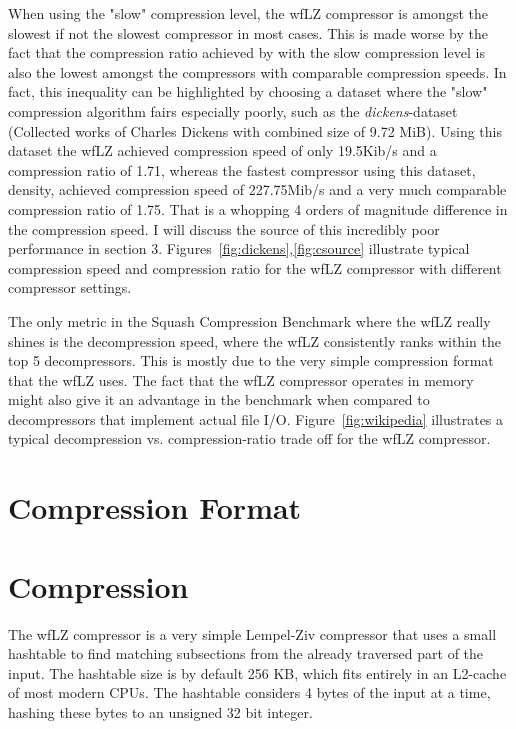 \documentclass[english]{tktltiki2}
\theoremstyle{definition}
\theoremstyle{remark}
\begin{document}
When using the "slow" compression level, the wfLZ compressor is amongst the slowest if not the slowest compressor in most cases. This is made worse by the fact that the compression ratio achieved by with the slow compression level is also the lowest amongst the compressors with comparable compression speeds. In fact, this inequality can be highlighted by choosing a dataset where the "slow" compression algorithm fairs especially poorly, such as the \textit{dickens}-dataset (Collected works of Charles Dickens with combined size of 9.72 MiB). Using this dataset the wfLZ achieved compression speed of only 19.5Kib/s and a compression ratio of 1.71, whereas the fastest compressor using this dataset, density, achieved compression speed of 227.75Mib/s and a very much comparable compression ratio of 1.75. That is a whopping 4 orders of magnitude difference in the compression speed. I will discuss the source of this incredibly poor performance in section 3. Figures~\ref{fig:dickens},\ref{fig:csource} illustrate typical compression speed and compression ratio for the wfLZ compressor with different compressor settings.      

The only metric in the Squash Compression Benchmark where the wfLZ really shines is the decompression speed, where the wfLZ consistently ranks within the top 5 decompressors. This is mostly due to the very simple compression format that the wfLZ uses. The fact that the wfLZ compressor operates in memory might also give it an advantage in the benchmark when compared to decompressors that implement actual file I/O. Figure~\ref{fig:wikipedia} illustrates a typical decompression vs. compression-ratio trade off for the wfLZ compressor.



\section{Compression Format}

\section{Compression}

The wfLZ compressor is a very simple Lempel-Ziv compressor that uses a small hashtable to find matching subsections from the already traversed part of the input. The hashtable size is by default 256 KB, which fits entirely in an L2-cache of most modern CPUs. The hashtable considers 4 bytes of the input at a time, hashing these bytes to an unsigned 32 bit integer.
\end{document}
